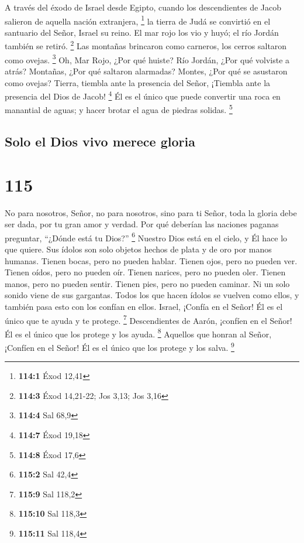  A través del éxodo de Israel desde Egipto, cuando los
descendientes de Jacob salieron de aquella nación extranjera,
\footnote{\textbf{114:1} Éxod 12,41}  la tierra de Judá se
convirtió en el santuario del Señor, Israel su reino.  El
mar rojo los vio y huyó; el río Jordán también se retiró. \footnote{\textbf{114:3}
  Éxod 14,21-22; Jos 3,13; Jos 3,16}  Las montañas brincaron
como carneros, los cerros saltaron como ovejas. \footnote{\textbf{114:4}
  Sal 68,9}  Oh, Mar Rojo, ¿Por qué huiste? Río Jordán, ¿Por
qué volviste a atrás?  Montañas, ¿Por qué saltaron
alarmadas? Montes, ¿Por qué se asustaron como ovejas? 
Tierra, tiembla ante la presencia del Señor, ¡Tiembla ante la presencia
del Dios de Jacob! \footnote{\textbf{114:7} Éxod 19,18}  Él
es el único que puede convertir una roca en manantial de aguas; y hacer
brotar el agua de piedras solidas. \footnote{\textbf{114:8} Éxod 17,6}

\hypertarget{solo-el-dios-vivo-merece-gloria}{%
\subsection{Solo el Dios vivo merece
gloria}\label{solo-el-dios-vivo-merece-gloria}}

\hypertarget{section-114}{%
\section{115}\label{section-114}}

 No para nosotros, Señor, no para nosotros, sino para ti
Señor, toda la gloria debe ser dada, por tu gran amor y verdad.
 Por qué deberían las naciones paganas preguntar, ``¿Dónde
está tu Dios?'' \footnote{\textbf{115:2} Sal 42,4}  Nuestro
Dios está en el cielo, y Él hace lo que quiere.  Sus ídolos
son solo objetos hechos de plata y de oro por manos humanas.
 Tienen bocas, pero no pueden hablar. Tienen ojos, pero no
pueden ver.  Tienen oídos, pero no pueden oír. Tienen
narices, pero no pueden oler.  Tienen manos, pero no pueden
sentir. Tienen pies, pero no pueden caminar. Ni un solo sonido viene de
sus gargantas.  Todos los que hacen ídolos se vuelven como
ellos, y también pasa esto con los confían en ellos. 
Israel, ¡Confía en el Señor! Él es el único que te ayuda y te protege.
\footnote{\textbf{115:9} Sal 118,2}  Descendientes de
Aarón, ¡confíen en el Señor! Él es el único que los protege y los ayuda.
\footnote{\textbf{115:10} Sal 118,3}  Aquellos que honran
al Señor, ¡Confíen en el Señor! Él es el único que los protege y los
salva. \footnote{\textbf{115:11} Sal 118,4}

